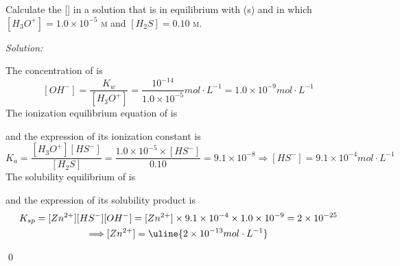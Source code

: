 \documentclass[12pt]{article}
\newenvironment{problem}[2][Problem]{\begin{trivlist}
\item[\hskip \labelsep {\bfseries #1}\hskip \labelsep {\bfseries #2.}]}{\end{trivlist}}
\newenvironment{sol}
    {\emph{Solution:}
    }
    {
    \qed
    }
\begin{document}
\begin{problem}{16.53}
Calculate the [] in a solution that is in equilibrium with (s) and in which $[H_3O^+]=1.0\times10^{-5}$ \textsc{m} and $[H_2S]=0.10$ \textsc{m}.
\end{problem}
\begin{sol}
The concentration of  is
\[
[OH^-]=\frac{K_w}{[H_3O^+]}=\frac{10^{-14}}{1.0\times10^{-5}}mol\cdot L^{-1}=1.0\times10^{-9}mol\cdot L^{-1}
\]
The ionization equilibrium equation of  is
\begin{center}
\end{center}
and the expression of its ionization constant is
\[
K_a=\frac{[H_3O^+][HS^-]}{[H_2S]}=\frac{1.0\times10^{-5}\times[HS^-]}{0.10}=9.1\times10^{-8}\Longrightarrow[HS^-]=9.1\times10^{-4}mol\cdot L^{-1}
\]
The solubility equilibrium of  is
\begin{center}
\end{center}
and the expression of its solubility product is
\begin{gather*}
K_{sp}=[Zn^{2+}][HS^-][OH^-]=[Zn^{2+}]\times9.1\times10^{-4}\times1.0\times10^{-9}=2\times10^{-25}\\
\Longrightarrow[Zn^{2+}]=\uline{2\times10^{-13}mol\cdot L^{-1}}
\end{gather*}
\end{sol}
\end{document}

